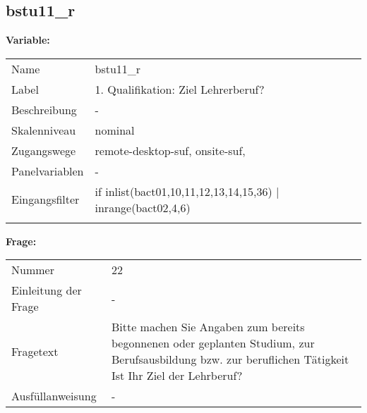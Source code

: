 	
	
	\subsection{bstu11\_r}
	\label{subSection:bstu11_r}

	\noindent\textbf{Variable:}\\
		\begin{tabular}{lL{11.3cm}}
			\label{tableVariable:bstu11_r}
			Name & bstu11\_r \\
			Label & 1. Qualifikation: Ziel Lehrerberuf? \\
			Beschreibung & - \\
			Skalenniveau & nominal \\
			Zugangswege &
				remote-desktop-suf,
				onsite-suf,
 \\
			Panelvariablen & -
			 \\
			Eingangsfilter & if inlist(bact01,10,11,12,13,14,15,36) | inrange(bact02,4,6)  \\
 \\
		\end{tabular}

		\vspace*{1 cm}
		\noindent\textbf{Frage:}\\
		\begin{tabular}{lL{11.3cm}}
			\label{tableQuestion:bstu11_r}
			Nummer & 22 \\
			Einleitung der Frage & - \\
			Fragetext & Bitte machen Sie Angaben zum bereits begonnenen oder geplanten Studium, zur Berufsausbildung bzw. zur beruflichen Tätigkeit
Ist Ihr Ziel der Lehrberuf? \\
			Ausfüllanweisung & - \\
		\end{tabular}





